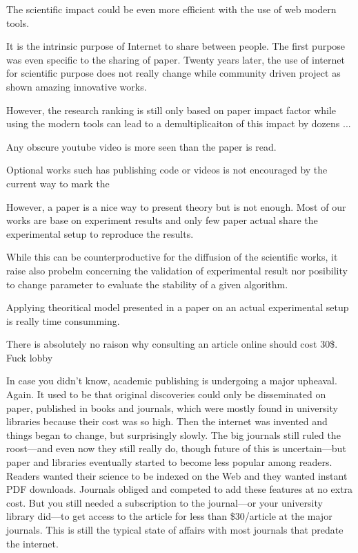 The scientific impact could be even more efficient with the use of web modern tools.

It is the intrinsic purpose of Internet to share between people. The first purpose was even specific to the sharing of paper. Twenty years later, the use of internet for scientific purpose does not really change while community driven project as shown amazing innovative works.

However, the research ranking is still only based on paper impact factor while using the modern tools can lead to a demultiplicaiton of this impact by dozens ...

Any obscure youtube video is more seen than the paper is read.

Optional works such has publishing code or videos is not encouraged by the current way to mark the

However, a paper is a nice way to present theory but is not enough. Most of our works are base on experiment results and only few paper actual share the experimental setup to reproduce the results.

While this can be counterproductive for the diffusion of the scientific works, it raise also probelm concerning the validation of experimental result nor posibility to change parameter to evaluate the stability of a given algorithm.

Applying theoritical model presented in a paper on an actual experimental setup is really time consumming.

There is absolutely no raison why consulting an article online should cost 30\$. Fuck lobby

In case you didn’t know, academic publishing is undergoing a major upheaval. Again. It used to be that original discoveries could only be disseminated on paper, published in books and journals, which were mostly found in university libraries because their cost was so high. Then the internet was invented and things began to change, but surprisingly slowly. The big journals still ruled the roost—and even now they still really do, though future of this is uncertain—but paper and libraries eventually started to become less popular among readers. Readers wanted their science to be indexed on the Web and they wanted instant PDF downloads. Journals obliged and competed to add these features at no extra cost. But you still needed a subscription to the journal—or your university library did—to get access to the article for less than \$30/article at the major journals. This is still the typical state of affairs with most journals that predate the internet.

